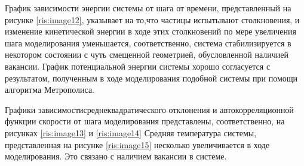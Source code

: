 \documentclass[14pt,a4paper,report]{ncc}
\begin{document}
График зависимости энергии системы от шага от времени, представленный на рисунке \ref{ris:image12}, указывает на то,что частицы испытывают столкновения, и изменение кинетической энергии в ходе этих столкновений по мере увеличения шага моделирования уменьшается, соответственно, система стабилизируется в некотором состоянии с чуть смещенной геометрией, обусловленной наличией вакансии. График потенциальной энергии системы хорошо согласуется с результатом, полученным в ходе моделирования подобной системы при помощи алгоритма Метрополиса. 
\

Графики зависимостисреднеквадратического отклонения и автокорреляционной функции скорости от шага моделирования представлены, соответственно, на рисунках \ref{ris:image13} и \ref{ris:image14}
Средняя температура системы, представленная на рисунке \ref{ris:image15} несколько увеличивается в ходе моделирования. Это связано с наличием вакансии в системе.
\
\end{document}
